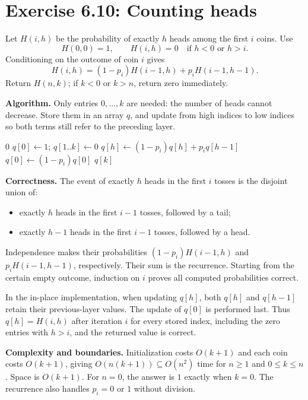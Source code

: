 \documentclass[11pt]{article}
\newcommand{\exercise}[2]{\section*{Exercise #1: #2}}
\begin{document}
\newpage
\exercise{6.10}{Counting heads}
Let $H(i,h)$ be the probability of exactly $h$ heads among the first $i$
coins. Use
\[
 H(0,0)=1,\qquad H(i,h)=0\quad\text{if }h<0\text{ or }h>i.
\]
Conditioning on the outcome of coin $i$ gives
\[
 \boxed{H(i,h)=(1-p_i)H(i-1,h)+p_iH(i-1,h-1).}
\]
Return $H(n,k)$; if $k<0$ or $k>n$, return zero immediately.

\textbf{Algorithm.}
Only entries $0,\ldots,k$ are needed: the number of heads cannot
decrease. Store them in an array $q$, and update from high indices to low
indices so both terms still refer to the preceding layer.
\begin{algorithm}[H]
\caption{Probability of exactly $k$ heads}
\begin{algorithmic}[1]
  \State \Return $0$ \EndIf
 \State $q[0]\gets1$; $q[1..k]\gets0$
   \State $q[h]\gets(1-p_i)q[h]+p_iq[h-1]$
  \EndFor
  \State $q[0]\gets(1-p_i)q[0]$
 \EndFor
 \State \Return $q[k]$
\EndFunction
\end{algorithmic}
\end{algorithm}

\textbf{Correctness.}
The event of exactly $h$ heads in the first $i$ tosses is the disjoint
union of:
\begin{itemize}
 \item exactly $h$ heads in the first $i-1$ tosses, followed by a tail;
 \item exactly $h-1$ heads in the first $i-1$ tosses, followed by a head.
\end{itemize}
Independence makes their probabilities
$(1-p_i)H(i-1,h)$ and $p_iH(i-1,h-1)$, respectively. Their sum is the
recurrence. Starting from the certain empty outcome, induction on $i$
proves all computed probabilities correct.

In the in-place implementation, when updating $q[h]$, both $q[h]$ and
$q[h-1]$ retain their previous-layer values. The update of $q[0]$ is
performed last. Thus $q[h]=H(i,h)$ after iteration $i$ for every stored
index, including the zero entries with $h>i$, and the returned value
is correct.

\textbf{Complexity and boundaries.}
Initialization costs $O(k+1)$ and each coin costs $O(k+1)$, giving
$O(n(k+1))\subseteq\boxed{O(n^2)}$ time for $n\ge1$ and $0\le k\le n$.
Space is $O(k+1)$. For $n=0$, the answer is $1$ exactly when $k=0$.
The recurrence also handles $p_i=0$ or $1$ without division.
\end{document}
